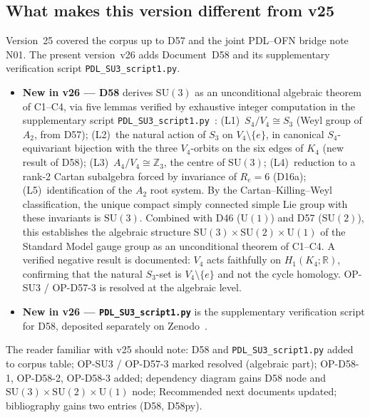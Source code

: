 \documentclass[11pt,a4paper]{article}
\theoremstyle{plain}
\theoremstyle{definition}
\theoremstyle{remark}
\begin{document}
\subsection{What makes this version different from v25}
\label{subsec:diffv24}
Version~25 covered the corpus up to D57 and the joint PDL--OFN bridge note N01. The present version~v26 adds Document~D58 and its supplementary verification script \texttt{PDL\_SU3\_script1.py}.  \begin{itemize} \item \textbf{New in v26 --- D58} derives $\mathrm{SU}(3)$ as an unconditional algebraic theorem of C1--C4, via five lemmas verified by exhaustive integer computation in the supplementary script \texttt{PDL\_SU3\_script1.py}~\cite{D58py}: (L1)~$S_4/V_4 \cong S_3$ (Weyl group of $A_2$, from D57); (L2)~the natural action of $S_3$ on $V_4\setminus\{e\}$, in canonical $S_4$-equivariant bijection with the three $V_4$-orbits on the six edges of $K_4$ (new result of D58); (L3)~$A_4/V_4 \cong \mathbb{Z}_3$, the centre of $\mathrm{SU}(3)$; (L4)~reduction to a rank-2 Cartan subalgebra forced by invariance of $R_e = 6$ (D16a); (L5)~identification of the $A_2$ root system. By the Cartan--Killing--Weyl classification, the unique compact simply connected simple Lie group with these invariants is $\mathrm{SU}(3)$. Combined with D46 ($\mathrm{U}(1)$) and D57 ($\mathrm{SU}(2)$), this establishes the algebraic structure $\mathrm{SU}(3)\times\mathrm{SU}(2)\times\mathrm{U}(1)$ of the Standard Model gauge group as an unconditional theorem of C1--C4. A verified negative result is documented: $V_4$ acts faithfully on $H_1(K_4;\mathbb{R})$, confirming that the natural $S_3$-set is $V_4\setminus\{e\}$ and not the cycle homology. OP-SU3 / OP-D57-3 is resolved at the algebraic level. \item \textbf{New in v26 --- \texttt{PDL\_SU3\_script1.py}} is the supplementary verification script for D58, deposited separately on Zenodo~\cite{D58py}. \end{itemize}  The reader familiar with v25 should note: D58 and \texttt{PDL\_SU3\_script1.py} added to corpus table; OP-SU3 / OP-D57-3 marked resolved (algebraic part); OP-D58-1, OP-D58-2, OP-D58-3 added; dependency diagram gains D58 node and $\mathrm{SU}(3)\times\mathrm{SU}(2)\times\mathrm{U}(1)$ node; Recommended next documents updated; bibliography gains two entries (D58, D58py).
\end{document}
